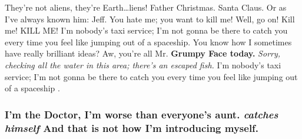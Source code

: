 \documentclass[]{report}
\begin{document}
They're not aliens, they're Earth\ldots{}liens! Father Christmas. Santa
Claus. Or as I've always known him: Jeff. You hate me; you want to kill
me! Well, go on! Kill me! KILL ME! I'm nobody's taxi service; I'm not
gonna be there to catch you every time you feel like jumping out of a
spaceship. You know how I sometimes have really brilliant ideas? Aw,
you're all Mr. \textbf{Grumpy Face today.} \emph{Sorry, checking all the
water in this area; there's an escaped fish.} I'm nobody's taxi service;
I'm not gonna be there to catch you every time you feel like jumping out
of a spaceship .



\subsubsection{\texorpdfstring{I'm the Doctor, I'm worse than everyone's
aunt. \emph{catches himself} And that is not how I'm introducing
myself.}{I'm the Doctor, I'm worse than everyone's aunt. catches himself And that is not how I'm introducing myself.}}\label{im-the-doctor-im-worse-than-everyones-aunt.-catches-himself-and-that-is-not-how-im-introducing-myself.}
\end{document}
